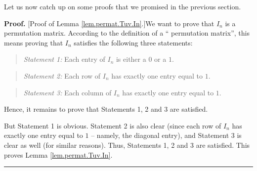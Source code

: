 \documentclass[numbers=enddot,12pt,final,onecolumn,notitlepage]{scrartcl}%
\theoremstyle{definition}
\newenvironment{statement}{\begin{quote}}{\end{quote}}
\newenvironment{proof}[1][Proof]{\noindent\textbf{#1.} }{\ \rule{0.5em}{0.5em}}
\begin{document}
Let us now catch up on some proofs that we promised in the previous section.

\begin{proof}
[Proof of Lemma \ref{lem.permat.Tuv.In}.]We want to prove that $I_{n}$ is a
permutation matrix. According to the definition of a \textquotedblleft
permutation matrix\textquotedblright, this means proving that $I_{n}$
satisfies the following three statements:

\begin{statement}
\textit{Statement 1:} Each entry of $I_{n}$ is either a $0$ or a $1$.
\end{statement}

\begin{statement}
\textit{Statement 2:} Each row of $I_{n}$ has exactly one entry equal to $1$.
\end{statement}

\begin{statement}
\textit{Statement 3:} Each column of $I_{n}$ has exactly one entry equal to
$1$.
\end{statement}

Hence, it remains to prove that Statements 1, 2 and 3 are satisfied.

But Statement 1 is obvious. Statement 2 is also clear (since each row of
$I_{n}$ has exactly one entry equal to $1$ -- namely, the diagonal entry), and
Statement 3 is clear as well (for similar reasons). Thus, Statements 1, 2 and
3 are satisfied. This proves Lemma \ref{lem.permat.Tuv.In}.
\end{proof}
\end{document}
